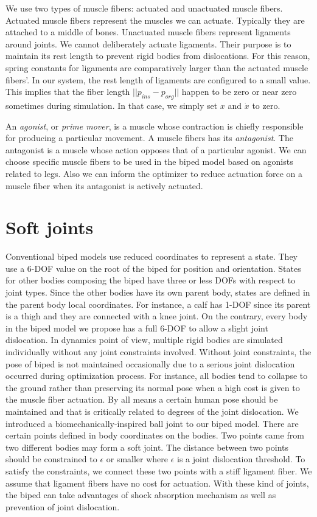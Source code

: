\documentclass[master,english,final]{kaist-ucs}
\begin{document}
We use two types of muscle fibers: actuated and unactuated muscle fibers.
Actuated muscle fibers represent the muscles we can actuate. Typically
they are attached to a middle of bones. Unactuated muscle fibers represent
ligaments around joints. We cannot deliberately actuate ligaments. Their
purpose is to maintain its rest length to prevent rigid bodies from
dislocations. For this reason, spring constants for ligaments are
comparatively larger than the actuated muscle fibers'.
In our system, the rest length of ligaments are configured to a small value.
This implies that the fiber length $||p_{ins}-p_{org}||$ happen to be zero
or near zero sometimes during simulation. In that case, we simply set
$x$ and $\dot{x}$ to zero.

An \emph{agonist}, or \emph{prime mover}, is a muscle whose contraction is chiefly responsible for producing a particular movement.
A muscle fibers has its \emph{antagonist}. The antagonist is a muscle whose action opposes that of a particular agonist.
We can choose specific muscle fibers to be used in the biped model based on agonists related to legs.
Also we can inform the optimizer to reduce actuation force on a muscle fiber when its antagonist is actively actuated.

\section{Soft joints}

Conventional biped models use reduced coordinates to represent a state.
They use a 6-DOF value on the root of the biped for position and orientation.
States for other bodies composing the biped have three or less DOFs with respect to joint types.
Since the other bodies have its own parent body, states are defined in the parent body local coordinates.
For instance, a calf has 1-DOF since its parent is a thigh and they are connected with a knee joint.
On the contrary, every body in the biped model we propose has a full 6-DOF to allow a slight joint dislocation.
In dynamics point of view, multiple rigid bodies are simulated individually without any joint constraints involved.
Without joint constraints, the pose of biped is not maintained occasionally due to a serious joint dislocation occurred during optimization process.
For instance, all bodies tend to collapse to the ground rather than preserving its normal pose when a high cost is given to the muscle fiber actuation.
By all means a certain human pose should be maintained and that is critically related to degrees of the joint dislocation.
We introduced a biomechanically-inspired ball joint to our biped model.
There are certain points defined in body coordinates on the bodies.
Two points came from two different bodies may form a soft joint.
The distance between two points should be constrained to $\epsilon$ or smaller where $\epsilon$ is a joint dislocation threshold.
To satisfy the constraints, we connect these two points with a stiff ligament fiber.
We assume that ligament fibers have no cost for actuation.
With these kind of joints, the biped can take advantages of shock absorption mechanism as well as prevention of joint dislocation.
\end{document}
